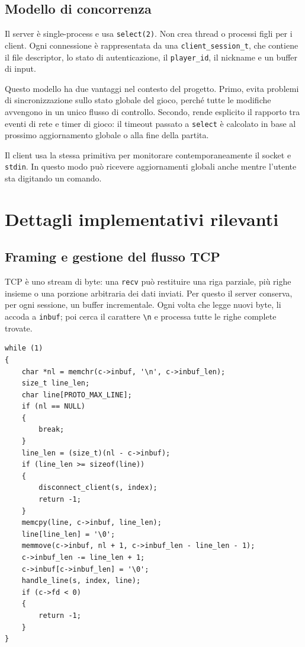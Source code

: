 \documentclass[11pt,a4paper]{article}
\begin{document}
\subsection{Modello di concorrenza}

Il server è single-process e usa \texttt{select(2)}. Non crea thread o processi figli per i client. Ogni connessione è rappresentata da una
\texttt{client\_session\_t}, che contiene il file descriptor, lo stato di autenticazione, il \texttt{player\_id}, il nickname e un buffer di input.

Questo modello ha due vantaggi nel contesto del progetto. Primo, evita problemi di sincronizzazione sullo stato globale del gioco, perché tutte le modifiche avvengono in un unico flusso di controllo. Secondo, rende esplicito il rapporto
tra eventi di rete e timer di gioco: il timeout passato a \texttt{select} è calcolato in base al prossimo aggiornamento globale o alla fine della partita.

Il client usa la stessa primitiva per monitorare contemporaneamente il socket e
\texttt{stdin}. In questo modo può ricevere aggiornamenti globali anche mentre l'utente sta digitando un comando.

\section{Dettagli implementativi rilevanti}

\subsection{Framing e gestione del flusso TCP}

TCP è uno stream di byte: una \texttt{recv} può restituire una riga parziale,
più righe insieme o una porzione arbitraria dei dati inviati. Per questo il server conserva, per ogni sessione, un buffer incrementale. Ogni volta che legge nuovi byte, li accoda a \texttt{inbuf}; poi cerca il carattere
\texttt{\textbackslash n} e processa tutte le righe complete trovate.

\begin{lstlisting}[style=cstyle, caption={Estrazione di righe complete da uno stream TCP nel server.}]
while (1)
{
    char *nl = memchr(c->inbuf, '\n', c->inbuf_len);
    size_t line_len;
    char line[PROTO_MAX_LINE];
    if (nl == NULL)
    {
        break;
    }
    line_len = (size_t)(nl - c->inbuf);
    if (line_len >= sizeof(line))
    {
        disconnect_client(s, index);
        return -1;
    }
    memcpy(line, c->inbuf, line_len);
    line[line_len] = '\0';
    memmove(c->inbuf, nl + 1, c->inbuf_len - line_len - 1);
    c->inbuf_len -= line_len + 1;
    c->inbuf[c->inbuf_len] = '\0';
    handle_line(s, index, line);
    if (c->fd < 0)
    {
        return -1;
    }
}
\end{lstlisting}
\end{document}
